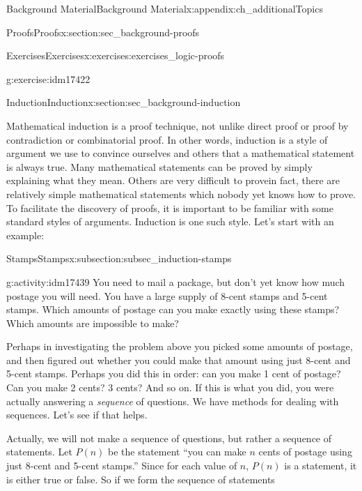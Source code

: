 \documentclass[oneside,10pt,]{book}
\numberwithin{equation}{chapter}
\begin{document}
\begin{appendixptx}{Background Material}{}{Background Material}{}{}{x:appendix:ch_additionalTopics}
\begin{sectionptx}{Proofs}{}{Proofs}{}{}{x:section:sec_background-proofs}
\begin{exercises-subsection}{Exercises}{}{Exercises}{}{}{x:exercises:exercises_logic-proofs}
\begin{divisionexercise}{20}{}{}{g:exercise:idm17422}
\begin{sidebyside}{1}{0.4}{0.4}{0}
\end{sidebyside}%
\end{divisionexercise}%
\end{exercises-subsection}
\end{sectionptx}
%
%
\typeout{************************************************}
\typeout{************************************************}
%
\begin{sectionptx}{Induction}{}{Induction}{}{}{x:section:sec_background-induction}
\begin{introduction}{}%
 Mathematical induction is a proof technique, not unlike direct proof or proof by contradiction or combinatorial proof. In other words, induction is a style of argument we use to convince ourselves and others that a mathematical statement is always true. Many mathematical statements can be proved by simply explaining what they mean. Others are very difficult to prove\textemdash{}in fact, there are relatively simple mathematical statements which nobody yet knows how to prove. To facilitate the discovery of proofs, it is important to be familiar with some standard styles of arguments. Induction is one such style. Let's start with an example:%
\end{introduction}%
%
%
\typeout{************************************************}
\typeout{************************************************}
%
\begin{subsectionptx}{Stamps}{}{Stamps}{}{}{x:subsection:subsec_induction-stamps}
\begin{activity}{}{g:activity:idm17439}%
You need to mail a package, but don't yet know how much postage you will need. You have a large supply of 8-cent stamps and 5-cent stamps. Which amounts of postage can you make exactly using these stamps? Which amounts are impossible to make?%
\end{activity}
Perhaps in investigating the problem above you picked some amounts of postage, and then figured out whether you could make that amount using just 8-cent and 5-cent stamps. Perhaps you did this in order: can you make 1 cent of postage? Can you make 2 cents? 3 cents? And so on. If this is what you did, you were actually answering a \emph{sequence} of questions. We have methods for dealing with sequences. Let's see if that helps.%
\par
Actually, we will not make a sequence of questions, but rather a sequence of statements. Let \(P(n)\)\label{g:notation:idm17445} be the statement ``you can make \(n\) cents of postage using just 8-cent and 5-cent stamps.'' Since for each value of \(n\), \(P(n)\) is a statement, it is either true or false. So if we form the sequence of statements%

\end{subsectionptx}
\end{sectionptx}
\end{appendixptx}
\end{document}
